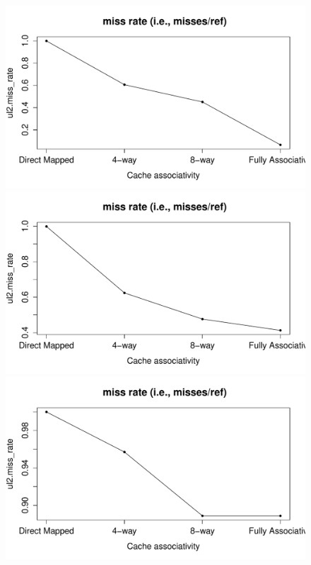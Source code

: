 \documentclass[10pt]{scrartcl}
\begin{document}
\begin{figure}[!htb]
  \includegraphics[trim={1cm 1.2cm 0 1.8cm},clip,width=\linewidth]{NewPlots/plot_A_miss_rate}
\endminipage\hfill
{}
  \includegraphics[trim={1cm 1.2cm 0 1.8cm},clip,width=\linewidth]{NewPlots/plot_A_A_miss_rate}
\endminipage\hfill
{}%
  \includegraphics[trim={1cm 1.2cm 0 1.8cm},clip,width=\linewidth]{NewPlots/plot_A_C_miss_rate}

\end{figure}
\end{document}
